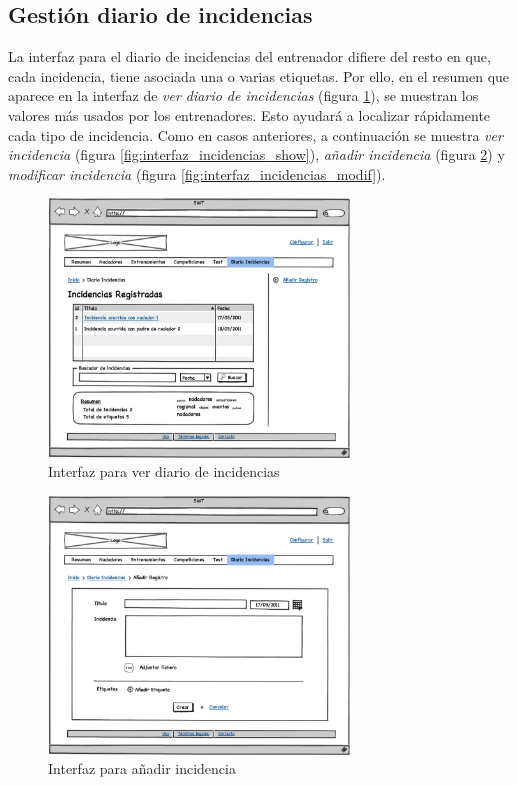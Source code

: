   	\subsection{Gestión diario de incidencias} %
  		\label{sub:interfaz_gestion_diario_de_incidencias}

  	La interfaz para el diario de incidencias del entrenador difiere del resto en que, cada incidencia, tiene asociada una o varias etiquetas. Por ello, en el resumen que aparece en la interfaz de {\it ver diario de incidencias} (figura \ref{fig:interfaz_incidencias}), se muestran los valores más usados por los entrenadores. Esto ayudará a localizar rápidamente cada tipo de incidencia. Como en casos anteriores, a continuación se muestra {\it ver incidencia} (figura \ref{fig:interfaz_incidencias_show}), {\it añadir incidencia} (figura \ref{fig:interfaz_incidencias_new}) y {\it modificar incidencia} (figura \ref{fig:interfaz_incidencias_modif}).

  		\begin{figure}[H]
  		  \centering
  		    \includegraphics[width=8cm]{./eps/p_interfaz/22_Diario.eps}
  		  \caption{Interfaz para ver diario de incidencias}
  		  \label{fig:interfaz_incidencias}
  		\end{figure}

  		\begin{figure}[H]
  		  \centering
  		    \includegraphics[width=8cm]{./eps/p_interfaz/23_Diario_new.eps}
  		  \caption{Interfaz para añadir incidencia}
  		  \label{fig:interfaz_incidencias_new}
  		\end{figure}

